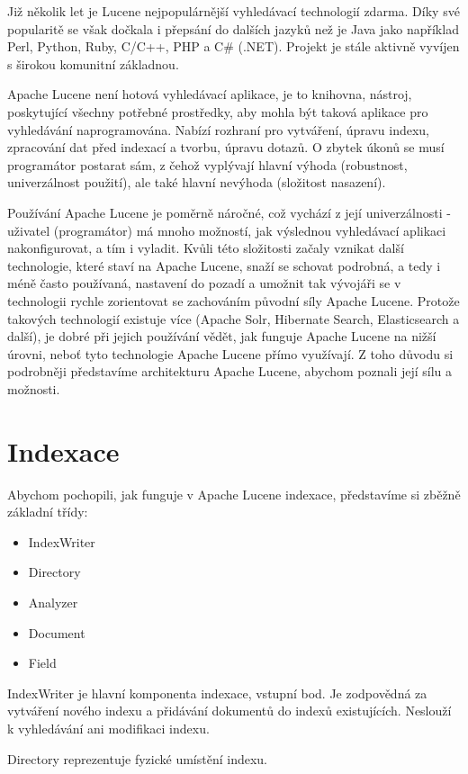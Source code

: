 \documentclass[11pt,draft,oneside]{fithesis2}
\begin{document}
Již několik let je Lucene nejpopulárnější vyhledávací technologií zdarma. Díky své popularitě se však dočkala i přepsání do dalších jazyků než je Java jako například Perl, Python, Ruby, C/C++, PHP a C\# (.NET). Projekt je stále aktivně vyvíjen s širokou komunitní základnou.

Apache Lucene není hotová vyhledávací aplikace, je to knihovna, nástroj, poskytující všechny potřebné prostředky, aby mohla být taková aplikace pro vyhledávání naprogramována. Nabízí rozhraní pro vytváření, úpravu indexu, zpracování dat před indexací a tvorbu, úpravu dotazů. O zbytek úkonů se musí programátor postarat sám, z čehož vyplývají hlavní výhoda (robustnost, univerzálnost použití), ale také hlavní nevýhoda (složitost nasazení).

Používání Apache Lucene je poměrně náročné, což vychází z její univerzálnosti - uživatel (programátor) má mnoho možností, jak výslednou vyhledávací aplikaci nakonfigurovat, a tím i vyladit. Kvůli této složitosti
začaly vznikat další technologie, které staví na Apache Lucene, snaží se schovat podrobná, a tedy i méně často používaná, nastavení do pozadí a umožnit tak vývojáři se v technologii rychle zorientovat se 
zachováním původní síly Apache Lucene. Protože takových technologií existuje více (Apache Solr, Hibernate Search, Elasticsearch a další), je dobré při jejich používání vědět, jak funguje Apache Lucene na nižší úrovni, neboť tyto technologie Apache Lucene přímo využívají. Z toho důvodu si podrobněji představíme architekturu Apache Lucene, abychom poznali její sílu a možnosti.

\section{Indexace}
Abychom pochopili, jak funguje v Apache Lucene indexace, představíme si zběžně základní třídy:
\begin{itemize}
	\item IndexWriter
	\item Directory
	\item Analyzer
	\item Document
	\item Field
\end{itemize}

IndexWriter je hlavní komponenta indexace, vstupní bod. Je zodpovědná za vytváření nového indexu a přidávání dokumentů do indexů existujících. Neslouží k vyhledávání ani modifikaci indexu.

Directory reprezentuje fyzické umístění indexu.
\end{document}
